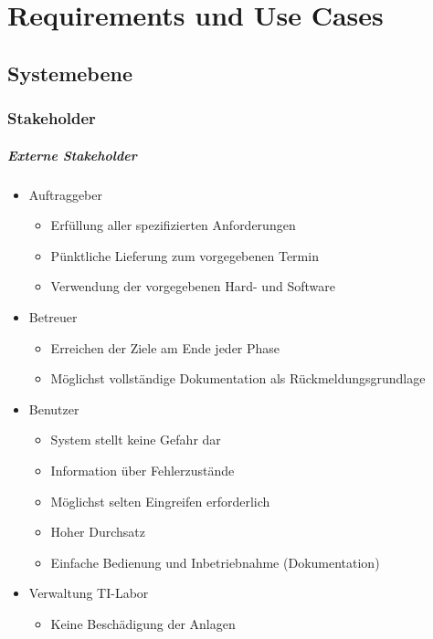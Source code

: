 \chapter{Requirements und Use Cases}\label{ch:requirements-und-use-cases}

\section{Systemebene}\label{sec:systemebene}


\subsection{Stakeholder}\label{subsec:stakeholder}


\paragraph{Externe Stakeholder}
\begin{itemize}
    \item Auftraggeber
    \begin{itemize}
        \item Erfüllung aller spezifizierten Anforderungen
        \item Pünktliche Lieferung zum vorgegebenen Termin
        \item Verwendung der vorgegebenen Hard- und Software
    \end{itemize}
    \item Betreuer
    \begin{itemize}
        \item Erreichen der Ziele am Ende jeder Phase
        \item Möglichst vollständige Dokumentation als Rückmeldungsgrundlage
    \end{itemize}
    \item Benutzer
    \begin{itemize}
        \item System stellt keine Gefahr dar
        \item Information über Fehlerzustände
        \item Möglichst selten Eingreifen erforderlich
        \item Hoher Durchsatz
        \item Einfache Bedienung und Inbetriebnahme (Dokumentation)
    \end{itemize}
    \item Verwaltung TI-Labor
    \begin{itemize}
        \item Keine Beschädigung der Anlagen
    \end{itemize}
\end{itemize}


